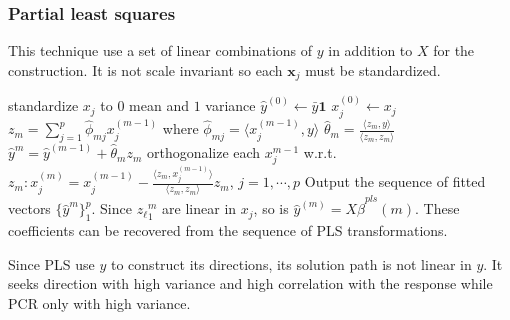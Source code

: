 \documentclass[12pt, letterpaper]{article}
\theoremstyle{definition}
\newcommand{\x}{\mathbf{x}}
\DeclarePairedDelimiter\autobracket{(}{)}
\newcommand{\br}[1]{\autobracket*{#1}}
\begin{document}

\subsubsection{Partial least squares}
This technique use a set of linear combinations of $y$ in addition to $X$ for the construction. It is not scale invariant so each $\x_j$ must be standardized.
\begin{algorithm}
standardize $x_j$ to $0$ mean and $1$ variance\;
$\hat{y}^{(0)}\leftarrow \bar{y}\mathbf{1}$\;
$x_j^{(0)} \leftarrow x_j$ \;
{
    $z_m  = \sum_{j=1}^p \hat{\phi}_{mj} x_j^{(m-1)}$ where $\hat{\phi}_{mj} = \langle x_j^{(m-1)}, y\rangle$ \; 
    $\hat{\theta}_m = \frac{\langle z_m, y\rangle}{\langle z_m, z_m\rangle} $\;
    $\hat{y}^m = \hat{y}^{(m-1)} + \hat{\theta}_m z_m$\;
    orthogonalize each $x_j^{m-1}$ w.r.t. $z_m: x_j^{(m)} = x_j^{(m-1)} - \frac{\langle z_m, x_j^{(m-1)}\rangle}{\langle z_m, z_m\rangle} z_m$, $j=1,\cdots, p$\;
}
Output the sequence of fitted vectors $\{\hat{y}^m\}_1^p$. Since ${z_\ell}_1^m$ are linear in $x_j$, so is $\hat{y}^{(m)} = X \hat{\beta}^{pls}(m)$. These coefficients can be recovered from the sequence of PLS transformations.
\end{algorithm}

Since PLS use $y$ to construct its directions, its solution path is not linear in $y$. It seeks direction with high variance and high correlation with the response while PCR only with high variance.
\end{document}
